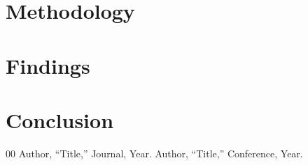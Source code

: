 \documentclass[conference]{IEEEtran}
\begin{document}
\section{Methodology}

\section{Findings}

\section{Conclusion}

\begin{thebibliography}{00}
 Author, ``Title,'' Journal, Year.
 Author, ``Title,'' Conference, Year.
\end{thebibliography}
\end{document}
